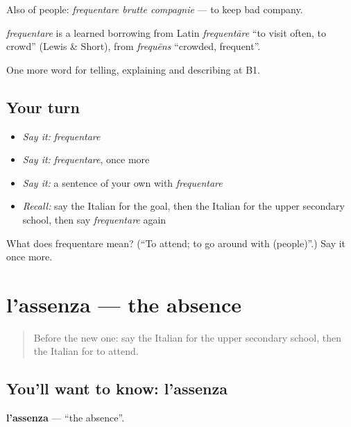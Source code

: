 Also of people: \emph{frequentare brutte compagnie} — to keep bad company.

\begin{cousinweb}
\emph{frequentare} is a learned borrowing from Latin \emph{frequentāre} \textquotedblleft{}to visit often, to crowd\textquotedblright{} (Lewis \& Short), from \emph{frequēns} \textquotedblleft{}crowded, frequent\textquotedblright{}.
\end{cousinweb}

\begin{grammarlens}[title={What you've built}]
One more word for telling, explaining and describing at B1.
\end{grammarlens}

\subsection*{Your turn}
\begin{itemize}
\raggedright
  \item \emph{Say it:} \emph{frequentare}
  \item \emph{Say it:} \emph{frequentare}, once more
  \item \emph{Say it:} a sentence of your own with \emph{frequentare}
  \item \emph{Recall:} say the Italian for the goal, then the Italian for the upper secondary school, then say \emph{frequentare} again
\end{itemize}

\begin{tcolorbox}[breakable,colback=teal!4,colframe=teal!35!black,title={Before you move on}]
What does frequentare mean? (\textquotedblleft{}To attend; to go around with (people)\textquotedblright{}.) Say it once more.
\end{tcolorbox}
\section[l'assenza]{l'assenza — the absence}

\label{lesson:IT-C379-assenza}



\begin{quote}
Before the new one: say the Italian for the upper secondary school, then the Italian for to attend.
\end{quote}

\subsection*{You'll want to know: l'assenza}
\textbf{l'assenza} — \textquotedblleft{}the absence\textquotedblright{}.


